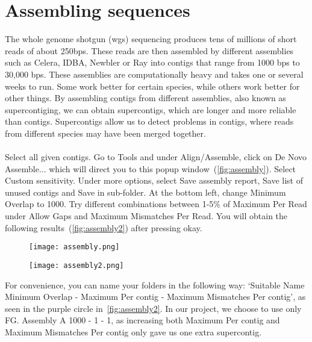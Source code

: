 \documentclass[11pt]{article}
\begin{document}
\newpage
\section{Assembling sequences}
\label{sec:Assembling}
The whole genome shotgun (wgs) sequencing produces tens of millions of short reads of about 250bps. These reads are then assembled by different assemblies such as Celera, IDBA, Newbler or Ray into contigs that range from 1000 bps to 30,000 bps. These assemblies are computationally heavy and takes one or several weeks to run. Some work better for certain species, while others work better for other things. By assembling contigs from different assemblies, also known as supercontiging, we can obtain supercontigs, which are longer and more reliable than contigs. Supercontigs allow us to detect problems in contigs, where reads from different species may have been merged together.  
\\
\\
Select all given contigs. Go to Tools and under Align/Assemble, click on De Novo Assemble... which will direct you to this popup window~(\autoref{fig:assembly}). Select Custom sensitivity. Under more options, select Save assembly report, Save list of unused contigs and Save in sub-folder. At the bottom left, change Minimum Overlap to 1000. Try different combinations between 1-5$\%$ of Maximum Per Read under Allow Gaps and Maximum Mismatches Per Read. You will obtain the following results~(\autoref{fig:assembly2}) after pressing okay. 

\begin{figure}[H]
  \centering
    \texttt{[image: assembly.png]}
  \label{fig:assembly}
\end{figure}

\begin{figure}[H]
  \centering
    \texttt{[image: assembly2.png]}
  \label{fig:assembly2}
\end{figure}

For convenience, you can name your folders in the following way: `Suitable Name Minimum Overlap - Maximum Per contig - Maximum Mismatches Per contig', as seen in the purple circle in~\autoref{fig:assembly2}. In our project, we choose to use only FG. Assembly A 1000 - 1 - 1, as increasing both Maximum Per contig and Maximum Mismatches Per contig only gave us one extra supercontig.  
\end{document}

